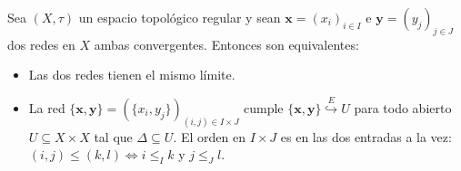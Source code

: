 \documentclass{article}
\theoremstyle{plain}
\theoremstyle{definition}
\newcommand{\evto}[1]{\stackrel{E}{\hookrightarrow} #1}   %
\newenvironment{ejercicio}[1]{\begin{trivlist}
\item[\hskip \labelsep {\bfseries Ejercicio}\hskip \labelsep {\bfseries #1.}]}{\end{trivlist}}
\begin{document}
\begin{ejercicio}{4}
    Sea \( (X, \tau) \) un espacio topológico regular y sean \( \mathbf{x} = {(x_i)}_{i \in I} \) e \( \mathbf{y} = {(y_j)}_{j \in J} \) dos redes en \( X \) ambas convergentes. Entonces son equivalentes:
    \begin{itemize}
        \item Las dos redes tienen el mismo límite.
        \item La red \( \{\mathbf{x}, \mathbf{y}\} = {(\{x_i, y_j\})}_{(i,j) \in I \times J} \) cumple \( \{\mathbf{x}, \mathbf{y}\} \evto{U} \) para todo abierto \( U \subseteq X \times X \) tal que \( \Delta \subseteq U \). El orden en \( I \times J \) es en las dos entradas a la vez: \( (i,j) \leq (k,l) \iff i \leq_I k \) y \( j \leq_J l \).
    \end{itemize}
\end{ejercicio}
\end{document}

